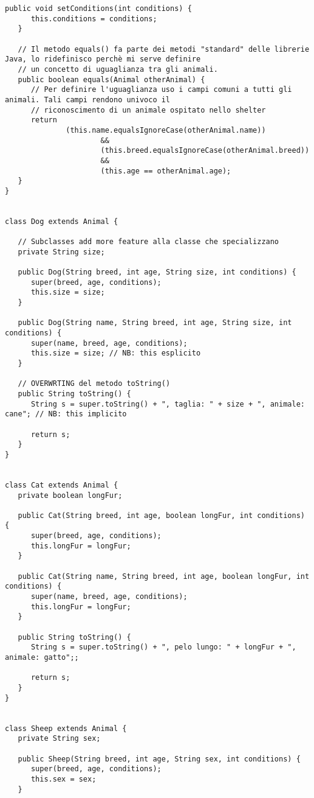 \documentclass{article}
\begin{document}
\begin{lstlisting}[caption={Animal.java}]
   public void setConditions(int conditions) {
      this.conditions = conditions;
   }

   // Il metodo equals() fa parte dei metodi "standard" delle librerie Java, lo ridefinisco perchè mi serve definire
   // un concetto di uguaglianza tra gli animali.
   public boolean equals(Animal otherAnimal) {
      // Per definire l'uguaglianza uso i campi comuni a tutti gli animali. Tali campi rendono univoco il
      // riconoscimento di un animale ospitato nello shelter
      return
              (this.name.equalsIgnoreCase(otherAnimal.name))
                      &&
                      (this.breed.equalsIgnoreCase(otherAnimal.breed))
                      &&
                      (this.age == otherAnimal.age);
   }
}


class Dog extends Animal {

   // Subclasses add more feature alla classe che specializzano
   private String size;

   public Dog(String breed, int age, String size, int conditions) {
      super(breed, age, conditions);
      this.size = size;
   }

   public Dog(String name, String breed, int age, String size, int conditions) {
      super(name, breed, age, conditions);
      this.size = size; // NB: this esplicito
   }

   // OVERWRTING del metodo toString()
   public String toString() {
      String s = super.toString() + ", taglia: " + size + ", animale: cane"; // NB: this implicito

      return s;
   }
}


class Cat extends Animal {
   private boolean longFur;

   public Cat(String breed, int age, boolean longFur, int conditions) {
      super(breed, age, conditions);
      this.longFur = longFur;
   }

   public Cat(String name, String breed, int age, boolean longFur, int conditions) {
      super(name, breed, age, conditions);
      this.longFur = longFur;
   }

   public String toString() {
      String s = super.toString() + ", pelo lungo: " + longFur + ", animale: gatto";;

      return s;
   }
}


class Sheep extends Animal {
   private String sex;

   public Sheep(String breed, int age, String sex, int conditions) {
      super(breed, age, conditions);
      this.sex = sex;
   }


\end{lstlisting}
\end{document}
